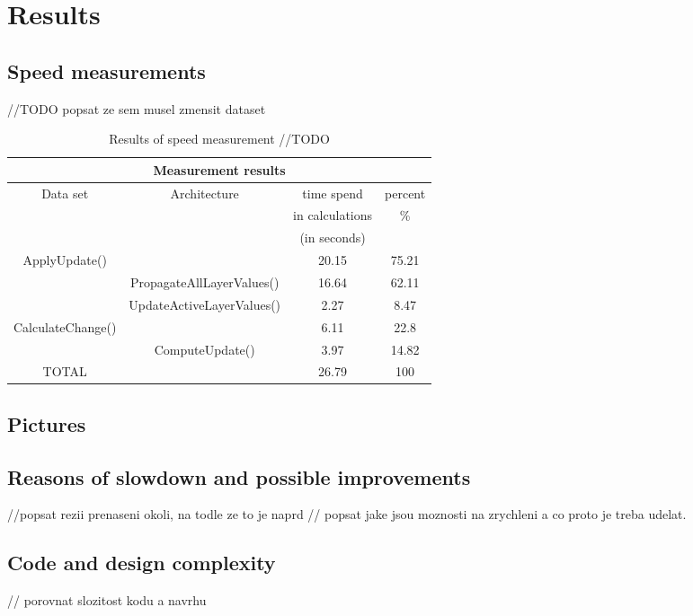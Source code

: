 \chapter{Results}

\section{Speed measurements}
//TODO popsat ze sem musel zmensit dataset

\begin{table}
\centering
\begin{tabular}{|c|c|c|c|}
\hline
\multicolumn{4}{|c|}{Measurement results}\\
\hline
Data set&Architecture&time spend&percent\\&&in calculations&\%\\&&(in seconds)&\\
\hline
\hline
ApplyUpdate()	&				&	20.15&	75.21\\
\hline
		&PropagateAllLayerValues()	&	16.64&	62.11\\
\hline
		&UpdateActiveLayerValues()	&	2.27&	8.47\\
\hline
CalculateChange()&				&	6.11&	22.8\\
\hline
		&ComputeUpdate()		&	3.97&	14.82\\
\hline
TOTAL		&				&	26.79&	100\\
\hline
\end{tabular}
\par
\caption[Measurement results]
{
  Results of speed measurement //TODO
}
\label{tab:runresults}
\end{table}

\section{Pictures}

\section{Reasons of slowdown and possible improvements}
//popsat rezii prenaseni okoli, na todle ze to je naprd
// popsat jake jsou moznosti na zrychleni a co proto je treba udelat.

\section{Code and design complexity}
// porovnat slozitost kodu a navrhu

